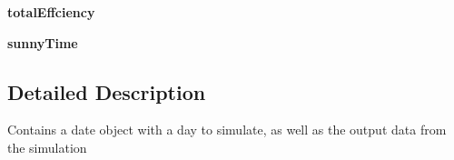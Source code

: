 \begin{DoxyCompactItemize}
\item 
\hypertarget{class_solar_calculator_1_1_simulation_1_1_simulation_day_a2eb808d42bb631a9a3d838664301f691}{{\bfseries total\-Effciency}}\label{class_solar_calculator_1_1_simulation_1_1_simulation_day_a2eb808d42bb631a9a3d838664301f691}

\item 
\hypertarget{class_solar_calculator_1_1_simulation_1_1_simulation_day_aca2b040005bbdd19cf33951b376ead7c}{{\bfseries sunny\-Time}}\label{class_solar_calculator_1_1_simulation_1_1_simulation_day_aca2b040005bbdd19cf33951b376ead7c}

\end{DoxyCompactItemize}


\subsection{Detailed Description}
\begin{DoxyVerb}Contains a date object with a day to simulate, as well as the output data from the
simulation\end{DoxyVerb}
 

